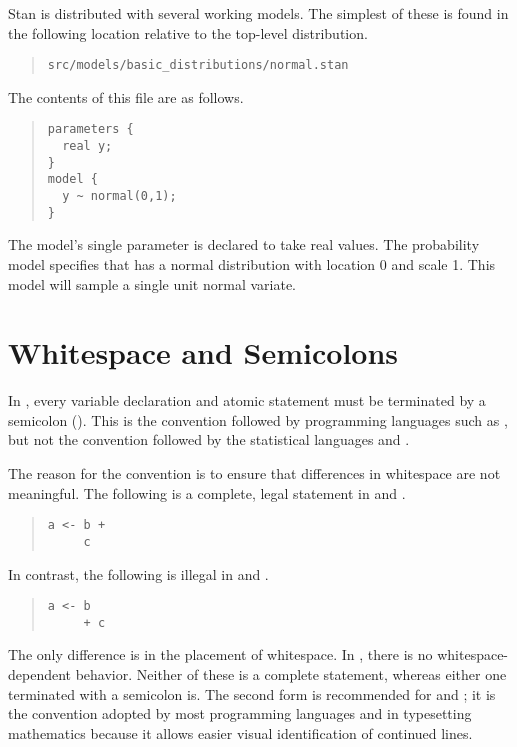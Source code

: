 Stan is distributed with several working models.  The simplest of
these is found in the following location relative to the top-level
distribution.
%
\begin{quote}
\begin{Verbatim}
src/models/basic_distributions/normal.stan
\end{Verbatim}
\end{quote}
%
The contents of this file are as follows.
%
\begin{quote}
\begin{Verbatim}
parameters {
  real y;
}
model {
  y ~ normal(0,1);
}
\end{Verbatim}
\end{quote}
%
The model's single parameter  is declared to take real values.
The probability model specifies that  has a normal
distribution with location 0 and scale 1.  This model will
sample a single unit normal variate.  

\section{Whitespace and Semicolons}

In \Stan, every variable declaration and atomic statement must be
terminated by a semicolon (\code{;}).  This is the convention followed
by programming languages such as \Cpp, but not the convention followed
by the statistical languages \R and \BUGS.

The reason for the \Cpp convention is to ensure that differences in
whitespace are not meaningful.  The following is a complete, legal
statement in \R and \BUGS.
%
\begin{quote}
\begin{Verbatim}
a <- b +
     c
\end{Verbatim}
\end{quote}
%
In contrast, the following is illegal in \R and \BUGS.
%
\begin{quote}
\begin{Verbatim}
a <- b
     + c
\end{Verbatim}
\end{quote}
%
The only difference is in the placement of whitespace.  In \Stan,
there is no whitespace-dependent behavior.  Neither of these is a
complete statement, whereas either one terminated with a semicolon is.
The second form is recommended for \Cpp and \Stan; it is the
convention adopted by most programming languages and in typesetting
mathematics because it allows easier visual identification of
continued lines.


